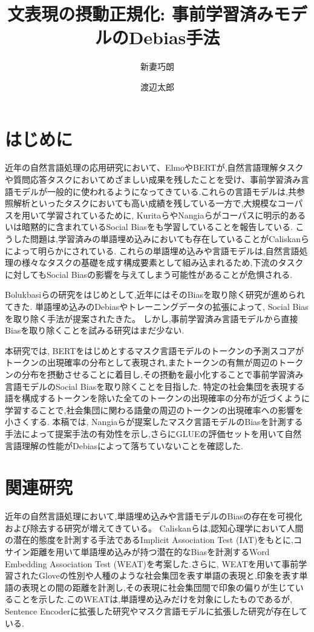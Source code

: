 \documentclass[
  platex, dvipdfmx %
]{nlp2021}
\title{文表現の摂動正規化: 事前学習済みモデルのDebias手法}
\author{新妻巧朗}
\author{渡辺太郎}
\affil{奈良先端科学技術大学院大学 先端科学技術研究科 \\ \texttt{\{niitsuma.takuro.nm3, taro\}@is.naist.jp}}
\begin{document}
\maketitle

\section{はじめに}
近年の自然言語処理の応用研究において、Elmo\cite{Peters:2018}やBERT\cite{devlin2018bert}が,自然言語理解タスクや質問応答タスクにおいてめざましい成果を残したことを受け、事前学習済み言語モデルが一般的に使われるようになってきている.これらの言語モデルは,共参照解析\cite{joshi2019spanbert}といったタスクにおいても高い成績を残している一方で,大規模なコーパスを用いて学習されているために, Kuritaら\cite{kurita2019measuring}やNangiaら\cite{nangia2020crows}がコーパスに明示的あるいは暗黙的に含まれているSocial Biasをも学習していることを報告している.
こうした問題は,学習済みの単語埋め込みにおいても存在していることがCaliskanら\cite{caliskan2017}によって明らかにされている.
これらの単語埋め込みや言語モデルは,自然言語処理の様々なタスクの基礎を成す構成要素として組み込まれるため,下流のタスクに対してもSocial Biasの影響を与えてしまう可能性があることが危惧される.

Bolukbasiら\cite{bolukbasi2016man}の研究をはじめとして,近年にはそのBiasを取り除く研究が進められてきた.
単語埋め込みのDebiasやトレーニングデータの拡張によって, Social Biasを取り除く手法\cite{kaneko-bollegala-2019-gender, zhao-etal-2018-gender, lucas2018}が提案されたきた。
しかし,事前学習済み言語モデルから直接Biasを取り除くことを試みる研究はまだ少ない.

本研究では, BERTをはじめとするマスク言語モデルのトークンの予測スコアがトークンの出現確率の分布として表現され,またトークンの有無が周辺のトークンの分布を摂動させることに着目し,その摂動を最小化することで事前学習済み言語モデルのSocial Biasを取り除くことを目指した.
特定の社会集団を表現する語を構成するトークンを除いた全てのトークンの出現確率の分布が近づくように学習することで,社会集団に関わる語彙の周辺のトークンの出現確率への影響を小さくする.
本稿では, Nangiaら\cite{nangia2020crows}が提案したマスク言語モデルのBiasを計測する手法によって提案手法の有効性を示し,さらにGLUE\cite{wang2018glue}の評価セットを用いて自然言語理解の性能がDebiasによって落ちていないことを確認した.

\section{関連研究}
近年の自然言語処理において,単語埋め込みや言語モデルのBiasの存在を可視化および除去する研究が増えてきている。
Caliskanら\cite{caliskan2017}は,認知心理学において人間の潜在的態度を計測する手法であるImplicit Association Test (IAT)\cite{Greenwald98measuringindividual}をもとに,コサイン距離を用いて単語埋め込みが持つ潜在的なBiasを計測するWord Embedding Association Test (WEAT)を考案した.さらに, WEATを用いて事前学習されたGlove\cite{pennington2014glove}の性別や人種のような社会集団を表す単語の表現と,印象を表す単語の表現との間の距離を計測し,その表現に社会集団間で印象の偏りが生じていることを示した.このWEATは,単語埋め込みだけを対象にしたものであるが, Sentence Encoderに拡張した研究\cite{may-etal-2019-measuring}やマスク言語モデルに拡張した研究\cite{kurita2019measuring}が存在している.
\end{document}
